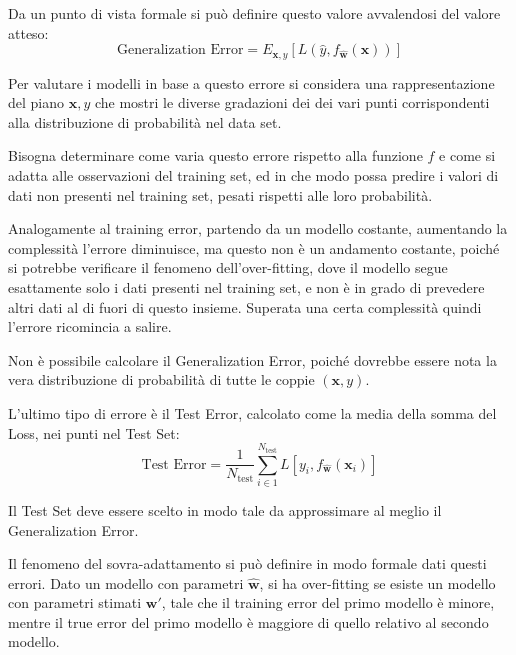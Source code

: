 \documentclass{article}
\numberwithin{equation}{subsection}
\newcommand{\vect}[1]{\boldsymbol{\mathbf{#1}}}
\begin{document}
Da un punto di vista formale si può definire questo valore avvalendosi del valore atteso:
\begin{equation}
    \text{Generalization Error}=E_{\vect{x},y}[L(\hat{y}, f_{\vect{\hat{w}}}(\vect{x}))] 
\end{equation}

Per valutare i modelli in base a questo errore si considera una rappresentazione 
del piano $\vect{x},y$ che mostri le diverse gradazioni dei dei vari punti corrispondenti 
alla distribuzione di probabilità nel data set. 

Bisogna determinare come varia questo errore rispetto alla funzione $f$ e come si 
adatta alle osservazioni del training set, ed in che modo possa predire i valori di dati 
non presenti nel training set, pesati rispetti alle loro probabilità. 

Analogamente al training error, partendo da un modello costante, aumentando la complessità 
l'errore diminuisce, ma questo non è un andamento costante, poiché si potrebbe 
verificare il fenomeno dell'over-fitting, dove il modello segue esattamente solo i dati presenti nel training set, e non è in grado di prevedere altri dati al di fuori di questo insieme. Superata una certa complessità quindi l'errore ricomincia a salire. 

Non è possibile calcolare il Generalization Error, poiché dovrebbe essere nota la vera distribuzione di probabilità di tutte le coppie $(\vect{x}, y)$. 

L'ultimo tipo di errore è il Test Error, calcolato come la media della somma del Loss, nei 
punti nel Test Set:
\begin{equation}
    \text{Test Error}=\displaystyle\frac{1}{N_\text{test}}\sum_{i\in1}^{N_{\text{test}}}L[y_i,f_{\vect{\hat{w}}}(\vect{x}_i)]
\end{equation}

Il Test Set deve essere scelto in modo tale da approssimare al meglio il Generalization Error. 

Il fenomeno del sovra-adattamento si può definire in modo formale dati questi errori. 
Dato un modello con parametri $\vect{\hat{w}}$, si ha over-fitting se esiste un modello con 
parametri stimati $\vect{w}'$, tale che il training error del primo modello è 
minore, mentre il true error del primo modello è maggiore di quello relativo al secondo 
modello. 
\end{document}
